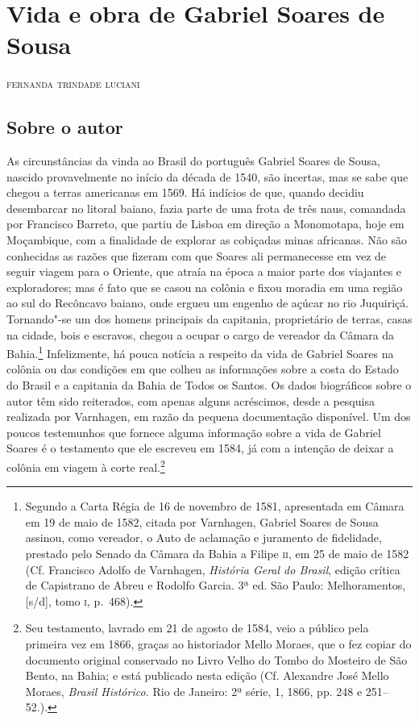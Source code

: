 \chapter{Vida e obra de Gabriel Soares de Sousa}

\begin{flushright}
\textsc{fernanda trindade luciani}\bigskip
\end{flushright}

\section{Sobre o autor}

\noindent{}As circunstâncias da vinda ao Brasil do português Gabriel Soares de
Sousa, nascido provavelmente no início da década de 1540, são incertas,
mas se sabe que chegou a terras americanas em 1569. Há indícios de que,
quando decidiu desembarcar no litoral baiano, fazia parte de uma frota
de três naus, comandada por Francisco Barreto, que partiu de Lisboa em
direção a Monomotapa, hoje em Moçambique, com a finalidade de explorar
as cobiçadas minas africanas. Não são conhecidas as razões que fizeram com que Soares ali
permanecesse em vez de seguir viagem para o Oriente, que atraía na
época a maior parte dos viajantes e exploradores; 
mas é fato que se casou na colônia e fixou moradia em uma região ao sul do
Recôncavo baiano, onde ergueu um engenho de açúcar no rio Juquiriçá.
Tornando"-se um dos homens principais da capitania, proprietário de
terras, casas na cidade, bois e escravos, chegou a ocupar o cargo de
vereador da Câmara da Bahia.\footnote{ Segundo a Carta Régia de 16 de
novembro de 1581, apresentada em Câmara em 19 de maio de 1582, citada
por Varnhagen, Gabriel Soares de Sousa assinou, como vereador, o Auto
de aclamação e juramento de fidelidade, prestado pelo Senado da Câmara
da Bahia a Filipe \textsc{ii}, em 25 de maio de 1582 (Cf. Francisco Adolfo de
Varnhagen, \textit{História Geral do Brasil}, edição crítica de Capistrano de 
Abreu e Rodolfo Garcia. 3ª ed. São Paulo: Melhoramentos, [s/d], tomo \textsc{i}, p.~468).}
Infelizmente, há pouca notícia a respeito da vida de Gabriel Soares na
colônia ou das condições em que colheu as informações sobre a costa do
Estado do Brasil e a capitania da Bahia de Todos os Santos. Os dados
biográficos sobre o autor têm sido reiterados, com apenas alguns
acréscimos, desde a pesquisa realizada por Varnhagen, em razão da
pequena documentação disponível. Um dos poucos testemunhos que fornece
alguma informação sobre a vida de Gabriel Soares é o testamento que ele
escreveu em 1584, já com a intenção de deixar a colônia em viagem à corte
real.\footnote{ Seu testamento, lavrado em 21 de agosto de 1584, veio a
público pela primeira vez em 1866, graças ao historiador Mello Moraes,
que o fez copiar do documento original conservado no Livro Velho do
Tombo do Mosteiro de São Bento, na Bahia; e está publicado nesta edição
(Cf. Alexandre José Mello Moraes, \textit{Brasil Histórico.} Rio de
Janeiro: 2ª série, 1, 1866, pp. 248 e 251--52.).}

